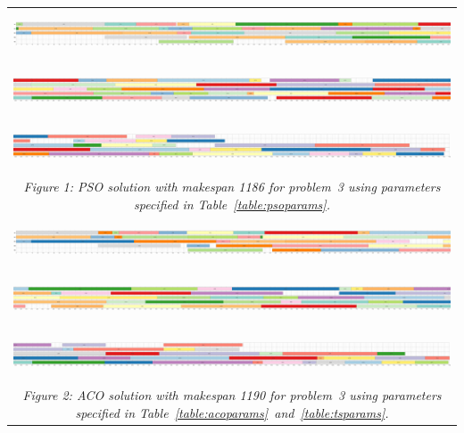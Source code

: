 \documentclass[paper=a4, fontsize=9pt]{scrartcl}
\begin{document}
\begin{landscape}
{
\begin{table}
\hspace*{-0.5cm}
\centering
\begin{tabular}{l}
\includegraphics[height=40pt]{figures/solution_pso_instance_3_1_scaled}\\[0.15cm]
\hspace{0.90909pt}\includegraphics[height=40pt]{figures/solution_pso_instance_3_2_scaled}\\[0.15cm]
\hspace{0.90909pt}\includegraphics[height=40pt]{figures/solution_pso_instance_3_3_scaled}\\
\multicolumn{1}{c}{\textit{Figure 1: \acf{PSO} solution with makespan 1186 for problem~3 using parameters specified in Table~\ref{table:psoparams}.}}\\[1.2cm]
\includegraphics[height=40pt]{figures/solution_aco_instance_3_1_scaled}\\[0.15cm]
\hspace{0.90909pt}\includegraphics[height=40pt]{figures/solution_aco_instance_3_2_scaled}\\[0.15cm]
\hspace{0.90909pt}\includegraphics[height=40pt]{figures/solution_aco_instance_3_3_scaled}\\
\multicolumn{1}{c}{\textit{Figure 2: \acf{ACO} solution with makespan 1190 for problem~3 using parameters specified in Table~\ref{table:acoparams}~and~\ref{table:tsparams}.}}\\[1.2cm]

\end{tabular}
\end{table}}
\end{landscape}
\end{document}
